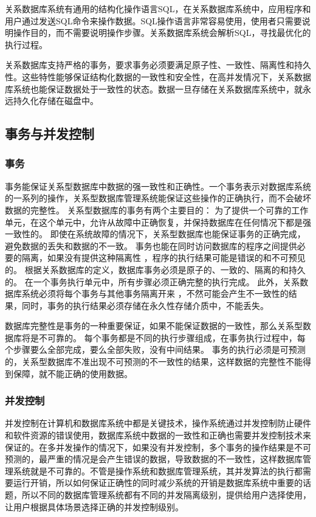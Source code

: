 关系数据库系统有通用的结构化操作语言SQL，在关系数据库系统中，应用程序和用户通过发送SQL命令来操作数据。SQL操作语言非常容易使用，使用者只需要说明操作目的，而不需要说明操作步骤。关系数据库系统会解析SQL，寻找最优化的执行过程。

关系数据库支持严格的事务，要求事务必须要满足原子性、一致性、隔离性和持久性。这些特性能够保证结构化数据的一致性和安全性，在高并发情况下，关系数据库系统也能保证数据处于一致性的状态。数据一旦存储在关系数据库系统中，就永远持久化存储在磁盘中。
\subsection{事务与并发控制}
\subsubsection{事务}
事务能保证关系型数据库中数据的强一致性和正确性。一个事务表示对数据库系统的一系列的操作，关系型数据库管理系统能保证这些操作的正确执行，而不会破坏数据的完整性。
关系型数据库的事务有两个主要目的：
为了提供一个可靠的工作单元，在这个单元中，允许从故障中正确恢复，并保持数据库在任何情况下都是强一致性的。
即使在系统故障的情况下，关系型数据库也能保证事务的正确完成，避免数据的丢失和数据的不一致。
事务也能在同时访问数据库的程序之间提供必要的隔离，如果没有提供这种隔离性
，程序的执行结果可能是错误的和不可预见的。
根据关系数据库的定义，数据库事务必须是原子的、一致的、隔离的和持久的。
在一个事务执行单元中，所有步骤必须正确完整的执行完成。
此外，关系数据库系统必须将每个事务与其他事务隔离开来
，不然可能会产生不一致性的结果，同时，事务的执行结果必须存储在永久性存储介质中，不能丢失。

数据库完整性是事务的一种重要保证，如果不能保证数据的一致性，那么关系型数据库将是不可靠的。
每个事务都是不同的执行步骤组成，在事务执行过程中，每个步骤要么全部完成，要么全部失败，没有中间结果。
事务的执行必须是可预测的，关系型数据库不准出现不可预测的不一致性的结果，这样数据的完整性不能得到保障，就不能正确的使用数据。
\subsubsection{并发控制}
并发控制在计算机和数据库系统中都是关键技术，操作系统通过并发控制防止硬件和软件资源的错误使用，数据库系统中数据的一致性和正确也需要并发控制技术来保证的。在多并发操作的情况下，如果没有并发控制，多个事务的操作结果是不可预测的，最严重的情况是会产生错误的数据，导致数据的不一致性，这样数据库管理系统就是不可靠的。不管是操作系统和数据库管理系统，其并发算法的执行都需要运行开销，所以如何保证正确性的同时减少系统的开销是数据库系统中重要的话题，所以不同的数据库管理系统都有不同的并发隔离级别，提供给用户选择使用，让用户根据具体场景选择正确的并发控制级别。

